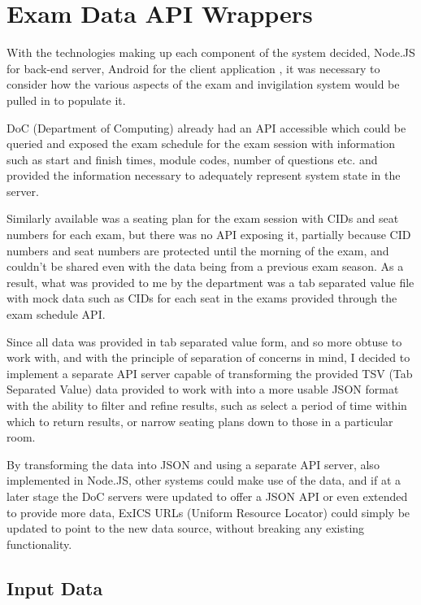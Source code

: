 \chapter{Exam Data API Wrappers}

\label{ch:apiwrappers}

With the technologies making up each component of the system decided, Node.JS for back-end server, Android for the client application , it was necessary to consider how the various aspects of the exam and invigilation system would be pulled in to populate it.

DoC (Department of Computing) already had an API accessible which could be queried and exposed the exam schedule for the exam session with information such as start and finish times, module codes, number of questions etc. and provided the information necessary to adequately represent system state in the server.

Similarly available was a seating plan for the exam session with CIDs and seat numbers for each exam, but there was no API exposing it, partially because CID numbers and seat numbers are protected until the morning of the exam, and couldn't be shared even with the data being from a previous exam season.  As a result, what was provided to me by the department was a tab separated value file with mock data such as CIDs for each seat in the exams provided through the exam schedule API.

Since all data was provided in tab separated value form, and so more obtuse to work with, and with the principle of separation of concerns \cite{sepofconcerns} in mind, I decided to implement a separate API server capable of transforming the provided TSV (Tab Separated Value) data provided to work with into a more usable JSON format with the ability to filter and refine results, such as select a period of time within which to return results, or narrow seating plans down to those in a particular room.

By transforming the data into JSON and using a separate API server, also implemented in Node.JS, other systems could make use of the data, and if at a later stage the DoC servers were updated to offer a JSON API or even extended to provide more data, ExICS URLs (Uniform Resource Locator) could simply be updated to point to the new data source, without breaking any existing functionality.

\section{Input Data}

